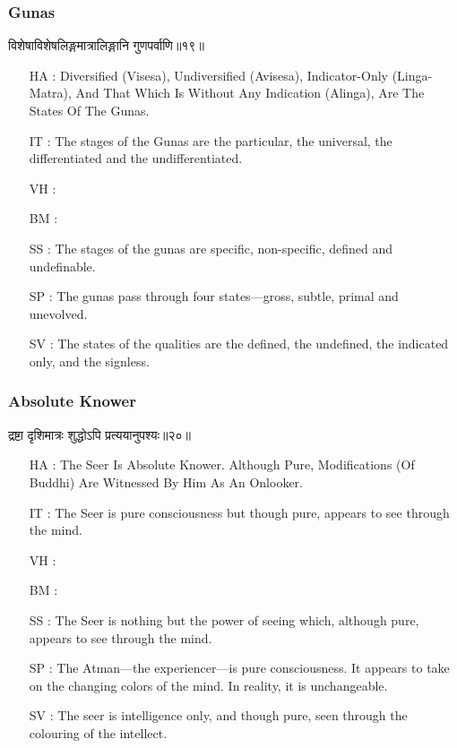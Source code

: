 \begin{frame}[fragile]\frametitle{Gunas}
\begin{sanskrit}
विशेषाविशेषलिङ्गमात्रालिङ्गानि गुणपर्वाणि॥१९॥
\end{sanskrit}

	\begin{itemize}
	\item [HA]: Diversified (Visesa), Undiversified (Avisesa), Indicator-Only (Linga-Matra), And That Which Is Without Any Indication (Alinga), Are The States Of The Gunas.
	\item [IT]: The stages of the Gunas are the particular, the universal, the differentiated and the undifferentiated.
	\item [VH]: 
	\item [BM]: 
	\item [SS]: The stages of the gunas are specific, non-specific, defined and undefinable.
	\item [SP]: The gunas pass through four states—gross, subtle, primal and unevolved.
	\item [SV]: The states of the qualities are the defined, the undefined, the indicated only, and the signless. 
	\end{itemize}
\end{frame}

\begin{frame}[fragile]\frametitle{Absolute Knower}
\begin{sanskrit}
द्रष्टा दृशिमात्रः शुद्धोऽपि प्रत्ययानुपश्यः॥२०॥
\end{sanskrit}

	\begin{itemize}
	\item [HA]: The Seer Is Absolute Knower. Although Pure, Modifications (Of Buddhi) Are Witnessed By Him As An Onlooker.
	\item [IT]: The Seer is pure consciousness but though pure, appears to see through the mind.
	\item [VH]: 
	\item [BM]: 
	\item [SS]: The Seer is nothing but the power of seeing which, although pure, appears to see through the mind.
	\item [SP]: The Atman—the experiencer—is pure consciousness. It appears to take on the changing colors of the mind. In reality, it is unchangeable.
	\item [SV]: The seer is intelligence only, and though pure, seen through the colouring of the intellect. 
	\end{itemize}
\end{frame}


